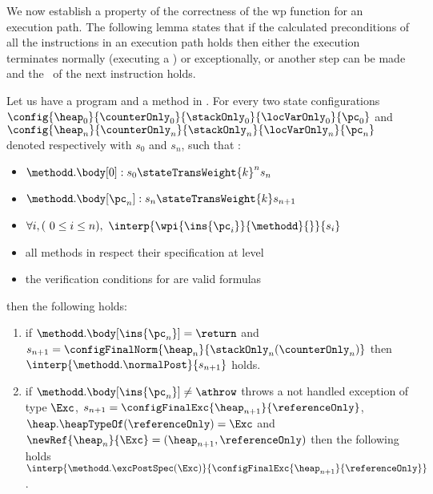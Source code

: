 We now establish a property of the correctness of the wp function  for an execution path. The following lemma states that if the calculated preconditions
of all the instructions in an execution path holds then either the execution terminates normally (executing a \return) or exceptionally, or 
another step can be made and the \fwpi \ of the next instruction holds.



\begin{lemma} \label{lemma1}
Let us have a program \Program{} and a method \methodd{} in \Program. 
For every two state configurations   
 $ \config{\heap_{0}}{\counterOnly_{0}}{\stackOnly_{0}}{\locVarOnly_{0}}{\pc_{0}}$ 
and  $\config{\heap_n}{\counterOnly_n}{\stackOnly_n}{\locVarOnly_n}{\pc_n} $ denoted respectively with $s_0$ and  $s_n$,
such that :
 \begin{itemize}
         \item $ \methodd.\body[0] : s_{0} \stateTransWeight{k}^{n} s_n$
         \item $ \methodd.\body[\pc_n] : s_n \stateTransWeight{k} s_{n+1}$
         \item $ \forall i, (\ 0 \leq i \leq n ) , \ \interp{\wpi{\ins{\pc_{i}} }{ \methodd } {  }}{ s_i } $  
	 \item all methods in \Program{} respect their specification at level   
	 \item the verification conditions for \Program{} are valid formulas
 \end{itemize}

then the following holds:
\begin{enumerate}
	\item if $\methodd.\body[\ins{\pc_n}] = \return$ and $s_{n+1} =\configFinalNorm{\heap_n}{\stackOnly_n( \counterOnly_n )} $ then $\interp{\methodd.\normalPost} {s_{n+1} }$ holds.  
	
        	\item if $\methodd.\body[\ins{\pc_n}] \neq \athrow  $ throws a not handled exception of type $\Exc$,
	 $ s_{n+1} = \configFinalExc{ \heap_{n+1}}{  \referenceOnly   }$, $\heap.\heapTypeOf(\referenceOnly) = \Exc  $ and  $\newRef{\heap_n}{\Exc} = (\heap_{n+1}, \referenceOnly )$
	 then the following  holds \\ $\interp{\methodd.\excPostSpec( \Exc)}{\configFinalExc{\heap_{n+1}}{\referenceOnly}}$.
	

\end{enumerate}
\end{lemma}
